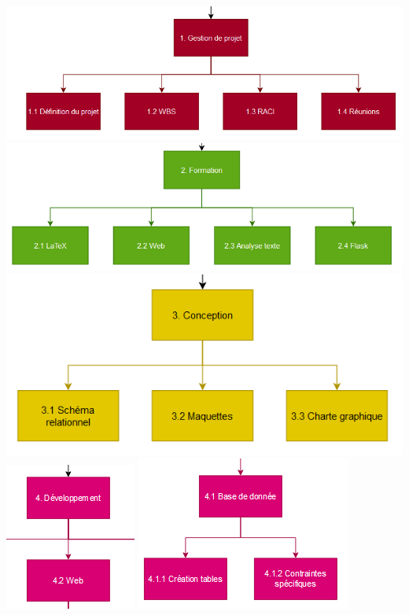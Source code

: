 \documentclass{article}
\begin{document}
\includegraphics[scale=0.75]{1.png} \\
\includegraphics[scale=0.75]{2.png} \\
\includegraphics[scale=0.75]{3.png} \\
\includegraphics[scale=0.75]{4.png} 
\includegraphics[scale=0.75]{5.png} 
\end{document}
